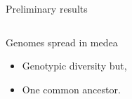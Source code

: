 \documentclass[8pt,handout,notes=show]{beamer}
\begin{document}
\begin{frame}{Preliminary results}
\begin{columns}
\begin{block}{Genomes spread in medea}

\begin{itemize}
\item Genotypic diversity but,
\item One common ancestor. 
\end{itemize}

\end{block}
\end{columns}
\end{frame}

\end{document}
